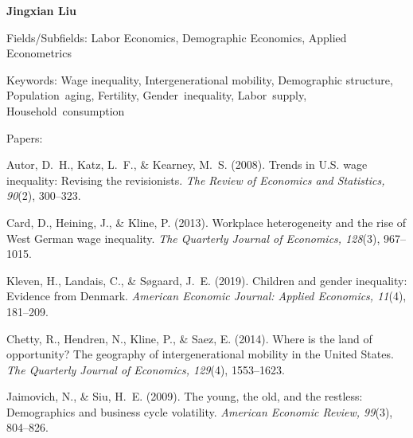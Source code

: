 \documentclass[12pt,a4paper]{article}
\begin{document}
\raggedright
\textbf{Jingxian Liu}

Fields/Subfields: Labor Economics, Demographic Economics, Applied Econometrics

Keywords: Wage inequality, Intergenerational mobility, Demographic structure,
Population~aging, Fertility, Gender~inequality, Labor~supply, Household~consumption

Papers:

Autor, D.~H., Katz, L.~F., \& Kearney, M.~S. (2008).
  Trends in U.S. wage inequality: Revising the revisionists.
  \textit{The Review of Economics and Statistics, 90}(2), 300--323.

Card, D., Heining, J., \& Kline, P. (2013).
  Workplace heterogeneity and the rise of West German wage inequality.
  \textit{The Quarterly Journal of Economics, 128}(3), 967--1015.

Kleven, H., Landais, C., \& Søgaard, J.~E. (2019).
  Children and gender inequality: Evidence from Denmark.
  \textit{American Economic Journal: Applied Economics, 11}(4), 181--209.

Chetty, R., Hendren, N., Kline, P., \& Saez, E. (2014).
  Where is the land of opportunity? The geography of intergenerational
  mobility in the United States.
  \textit{The Quarterly Journal of Economics, 129}(4), 1553--1623.

Jaimovich, N., \& Siu, H.~E. (2009).
  The young, the old, and the restless: Demographics and business cycle volatility.
  \textit{American Economic Review, 99}(3), 804--826.
\end{document}
